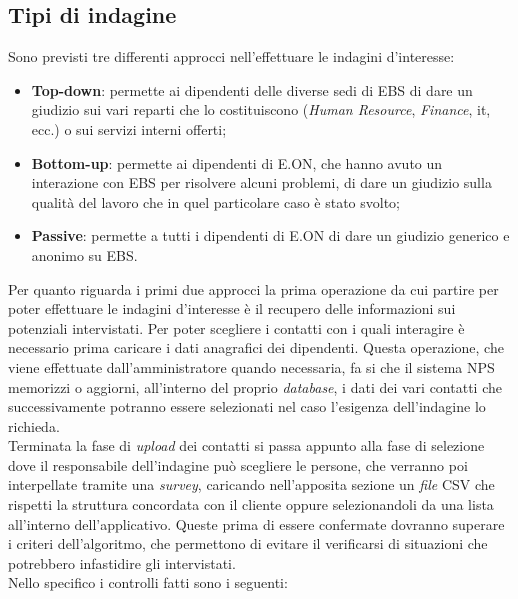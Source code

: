 \subsection{Tipi di indagine}
Sono previsti tre differenti approcci nell'effettuare le indagini d'interesse:
\begin{itemize}
\item \textbf{Top-down}: permette ai dipendenti delle diverse sedi di EBS di dare un giudizio sui vari reparti che lo costituiscono (\textit{Human Resource}, \textit{Finance}, \acrshort{it}, ecc.) o sui servizi interni offerti;
\item \textbf{Bottom-up}: permette ai dipendenti di E.ON, che hanno avuto un interazione con EBS per risolvere alcuni problemi, di dare un giudizio sulla qualità del lavoro che in quel particolare caso è stato svolto;
\item \textbf{Passive}: permette a tutti i dipendenti di E.ON di dare un giudizio generico e anonimo su EBS.
\end{itemize}
Per quanto riguarda i primi due approcci la prima operazione da cui partire per poter effettuare le indagini d'interesse è il recupero delle informazioni sui potenziali intervistati. Per poter scegliere i contatti con i quali interagire è necessario prima caricare i dati anagrafici dei dipendenti.
Questa operazione, che viene effettuate dall'amministratore quando necessaria, fa si che il sistema NPS memorizzi o aggiorni, all'interno del proprio \textit{database}, i dati dei vari contatti che successivamente potranno essere selezionati nel caso l'esigenza dell'indagine lo richieda. \\
Terminata la fase di \textit{upload} dei contatti si passa appunto alla fase di selezione dove il responsabile dell'indagine può scegliere le persone, che verranno poi interpellate tramite una \textit{survey}, caricando nell'apposita sezione un \textit{file} CSV che rispetti la struttura concordata con il cliente oppure selezionandoli da una lista all'interno dell'applicativo. Queste prima di essere confermate dovranno superare i criteri dell'algoritmo, che permettono di evitare il verificarsi di situazioni che potrebbero infastidire gli intervistati. \\
Nello specifico i controlli fatti sono i seguenti:
